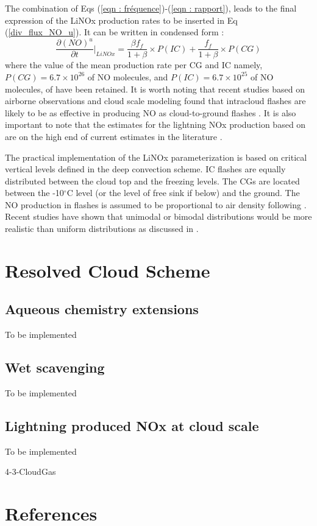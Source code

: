 The combination of Eqs (\ref{eqn : fréquence})-(\ref{eqn : rapport}), leads to
the final expression of the LiNOx production rates to be inserted in
Eq (\ref{div_flux_NO_u}). It can be written in condensed form :
\begin{equation}\label{LiNOx_rate_ud}
{\frac {\partial (NO)^{u}}{\partial t}} \bigg\vert_{LiNOx} = \frac{\beta f_f}{1+\beta}\times P(IC) + \frac{f_f}{1+\beta}\times P(CG)
\end{equation}
where the value of the mean production rate per CG and IC namely, 
$P(CG) = 6.7\times 10^{26}$ of NO molecules, and 
$P(IC) = 6.7\times 10^{25}$ of NO molecules, of
\citet{Price1997} have been retained. 
It is worth noting that recent studies based on airborne observations and 
cloud scale modeling found that intracloud flashes are likely to be as 
effective 
in producing NO as cloud-to-ground flashes 
\citep{DeCaria2000,Fehr2004,Ridley2005}. 
It is also important to note that the estimates for the lightning 
NOx production based on \citet{Price1992,Price1994,Price1997}
are on the high end of current estimates in the  literature
\citep{Labrador2005}. 

The practical implementation of the LiNOx parameterization is based on critical 
vertical levels defined in the deep convection scheme. IC flashes are equally 
distributed between the cloud top and the freezing levels. The CGs are located 
between the -10$^{\circ}$C level (or the level of free sink if below) and the 
ground. The NO production in flashes 
is assumed to be proportional to air density following 
\citet{Goldenbaum1993}. 
Recent studies have shown that unimodal or bimodal distributions would be more 
realistic than uniform distributions as discussed in 
\citet{MacGorman1998,DeCaria2000,DeCaria2005}. 

\section{Resolved Cloud Scheme}
 \subsection{Aqueous chemistry extensions}
To be implemented
 \subsection{Wet scavenging}
To be implemented
 \subsection{Lightning produced NOx at cloud scale}
To be implemented
%

\begin{btSect}{4-3-CloudGas}
\section{References}
\btPrintCited
\end{btSect}

